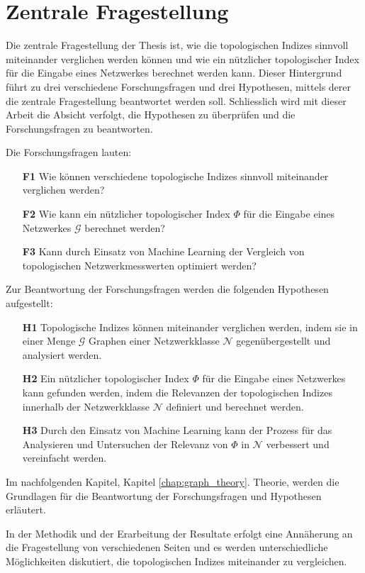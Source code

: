 \section{Zentrale Fragestellung}

Die zentrale Fragestellung der Thesis ist, wie die topologischen Indizes sinnvoll miteinander verglichen werden können und wie ein nützlicher topologischer Index für die Eingabe eines Netzwerkes berechnet werden kann. 
Dieser Hintergrund führt zu drei verschiedene Forschungsfragen und drei Hypothesen, mittels derer die zentrale Fragestellung beantwortet werden soll. 
Schliesslich wird mit dieser Arbeit die Absicht verfolgt, die Hypothesen zu überprüfen und die Forschungsfragen zu beantworten.

Die Forschungsfragen lauten:

\begin{itemize}
    \setlength\itemsep{0.3em}
    \item [\textbf{F1}] Wie können verschiedene topologische Indizes sinnvoll miteinander verglichen werden?
    \item [\textbf{F2}] Wie kann ein nützlicher topologischer Index $\Phi$ für die Eingabe eines Netzwerkes $\mathcal{G}$ berechnet werden?
    \item [\textbf{F3}] Kann durch Einsatz von Machine Learning der Vergleich von topologischen Netzwerkmesswerten optimiert werden?
\end{itemize}

Zur Beantwortung der Forschungsfragen werden die folgenden Hypothesen aufgestellt:

\begin{itemize}
    \setlength\itemsep{0.5em}
    \item [\textbf{H1}] Topologische Indizes können miteinander verglichen werden, indem sie in einer Menge $\mathcal{G}$ Graphen einer Netzwerkklasse $\mathcal{N}$ gegenübergestellt und analysiert werden.
    \item [\textbf{H2}] Ein nützlicher topologischer Index $\Phi$ für die Eingabe eines Netzwerkes kann gefunden werden, indem die Relevanzen der topologischen Indizes innerhalb der Netzwerkklasse $\mathcal{N}$ definiert und berechnet werden.
    \item [\textbf{H3}] Durch den Einsatz von Machine Learning kann der Prozess für das Analysieren und Untersuchen der Relevanz von $\Phi$ in $\mathcal{N}$ verbessert und vereinfacht werden.
\end{itemize}

Im nachfolgenden Kapitel, Kapitel \ref{chap:graph_theory}. Theorie, werden die Grundlagen für die Beantwortung der Forschungsfragen und Hypothesen erläutert.

In der Methodik und der Erarbeitung der Resultate erfolgt eine Annäherung an die Fragestellung von verschiedenen Seiten und es werden unterschiedliche Möglichkeiten diskutiert, die topologischen Indizes miteinander zu vergleichen.